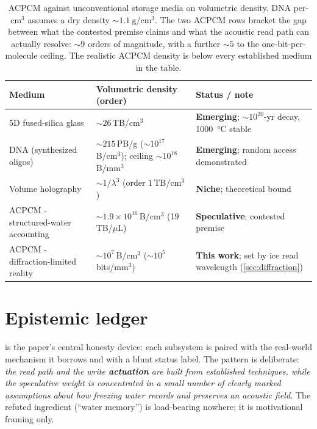 \documentclass[11pt]{article}
\theoremstyle{definition}
\begin{document}
\begin{table}[t]
\centering
\small
\renewcommand{\arraystretch}{1.25}
\begin{tabularx}{\textwidth}{@{}>{\raggedright\arraybackslash}p{}
  >{\raggedright\arraybackslash}p{}
  >{\raggedright\arraybackslash}X@{}}
\toprule
\textbf{Medium} & \textbf{Volumetric density (order)} & \textbf{Status / note} \\
\midrule
5D fused-silica glass
  & ${\sim}26$\,TB/cm$^3$
  & \textcolor{acpcmteal}{\bfseries Emerging}; ${\sim}10^{20}$-yr decay, \qty{1000}{\celsius} stable~\cite{zhang2014glass,lei2021optica} \\
DNA (synthesized oligos)
  & ${\sim}215$\,PB/g (${\sim}10^{17}$\,B/cm$^3$); ceiling ${\sim}10^{18}$\,B/mm$^3$
  & \textcolor{acpcmteal}{\bfseries Emerging}; random access demonstrated~\cite{erlich2017fountain,ceze2019molecular} \\
Volume holography
  & ${\sim}1/\lambda^3$ (order $1$\,TB/cm$^3$)
  & \textcolor{acpcmgray}{\bfseries Niche}; theoretical bound~\cite{heanue1994holographic,coufal2000holographic} \\
ACPCM - structured-water accounting
  & ${\sim}1.9\times10^{16}$\,B/cm$^3$ (19\,TB/$\mu$L)
  & \textcolor{warnrule}{\bfseries Speculative}; contested premise~\cite{pollack2013fourth} \\
ACPCM - diffraction-limited reality
  & ${\sim}10^{7}$\,B/cm$^3$ (${\sim}10^{5}$ bits/mm$^3$)
  & \textbf{This work}; set by ice read wavelength (\cref{sec:diffraction}) \\
\bottomrule
\end{tabularx}
\caption{ACPCM against unconventional storage media on volumetric density. DNA per-cm$^3$
assumes a dry density ${\sim}\qty{1.1}{\gram\per\centi\meter\cubed}$. The two ACPCM rows bracket the
gap between what the contested premise claims and what the acoustic read path can actually
resolve: ${\sim}9$ orders of magnitude, with a further ${\sim}5$ to the one-bit-per-molecule
ceiling. The realistic ACPCM density is below every established medium in the table.}
\label{tab:comparators}
\end{table}

\section{Epistemic ledger}
\label{sec:ledger}

 is the paper's central honesty device: each subsystem is paired with the
real-world mechanism it borrows and with a blunt status label. The pattern is deliberate:
\emph{the read path and the write \textbf{actuation} are built from established techniques,
while the speculative weight is concentrated in a small number of clearly marked assumptions
about how freezing water records and preserves an acoustic field.} The refuted ingredient
(``water memory'') is load-bearing nowhere; it is motivational framing only.
\end{document}
